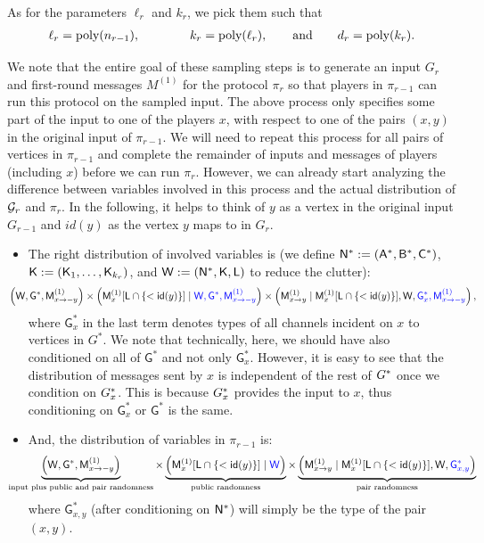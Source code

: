 \documentclass[11pt]{article}
\theoremstyle{definition}
\newcommand{\paren}[1]{\ensuremath{\left(#1\right)}\xspace}
\newcommand{\poly}{\mbox{\rm poly}}
\newcommand{\rv}[1]{\ensuremath{{\mathsf{#1}}}\xspace}
\newcommand{\rA}{\rv{A}}
\newcommand{\rB}{\rv{B}}
\newcommand{\rC}{\rv{C}}
\newcommand{\prot}{\ensuremath{\pi}}
\newcommand{\rG}{\ensuremath{\rv{G}}}
\newcommand{\rid}[1]{\ensuremath{\rv{id}(#1)}}
\begin{document}
As for the parameters $\ell_r$ and $k_r$, we pick them such that 
\begin{align}
	\ell_r = \poly(n_{r-1}), \qquad \qquad k_r = \poly(\ell_r), \qquad \text{and} \qquad d_r = \poly(k_r). \label{eq:overview-para2}
\end{align}
\vspace{-20pt}

We note that the entire goal of these sampling steps is to generate an input $G_r$ and first-round messages $M^{(1)}$ for the protocol $\prot_r$ so that players in $\prot_{r-1}$ can run this protocol on the sampled input. 
The above process only specifies some part of the input to one of the players $x$, with respect to one of the pairs $(x,y)$ in the original input of $\prot_{r-1}$. We will need to repeat this process for all pairs of 
vertices in $\prot_{r-1}$ and complete the remainder of inputs and messages of players (including $x$) before we can run $\prot_r$. However, we can already start analyzing the difference between variables involved in this process 
and the actual distribution of $\mathcal{G}_r$ and $\prot_r$. In the following, it helps to think of $y$ as a vertex in the original input $G_{r-1}$ and $id(y)$ as 
the vertex $y$ maps to in $G_r$. 
\vspace{-7pt}
\begin{itemize}
	\item The right distribution of involved variables is (we define $\rN^* := (\rA^*,\rB^*,\rC^*)$, $\rK := (\rK_1,\ldots,\rK_{k_r})$, and $\rW := (\rN^*,\rK,\rL)$ to reduce the clutter): 
	\[
	\hspace{-20pt}	\paren{\rW,\rG^*,\rM^{(1)}_{x \rightarrow -y}} \times \paren{\rM^{(1)}_{x}[\rL \cap \{<\rid{y}\}] \mid \eqcolor{\rW,\rG^*,\rM^{(1)}_{x \rightarrow -y}}} \times \paren{\rM^{(1)}_{x \rightarrow y} \mid \rM^{(1)}_{x}[\rL \cap \{<\rid{y}\}] , \rW,\eqcolor{\rG^*_x,\rM^{(1)}_{x \rightarrow -y}}},
	\]
	where  $\rG^*_x$ in the last term denotes types of all channels incident on $x$ to vertices in $G^*$. We note that technically, here, we should have also
	conditioned on all of $\rG^*$ and not only $\rG^*_x$. However, it is easy to see that the distribution of messages sent by $x$ is independent of the rest of $G^*$ once we condition on $G^*_x$. This is because $G^*_x$ provides
	the input to $x$, thus conditioning on $\rG^*_x$ or $\rG^*$ is the same. 
	\item And, the distribution of variables in $\prot_{r-1}$ is: 
	\[
	\hspace{-20pt}	\underbrace{\paren{\rW,\rG^*,\rM^{(1)}_{x \rightarrow -y}}}_{\textnormal{input plus public and pair randomness}} \times \underbrace{\paren{\rM^{(1)}_{x}[\rL \cap \{<\rid{y}\}] \mid \eqcolor{\rW}}}_{\textnormal{public randomness}} \times 
	\underbrace{\paren{\rM^{(1)}_{x \rightarrow y} \mid \rM^{(1)}_{x}[\rL \cap \{<\rid{y}\}] , \rW,\eqcolor{\rG_{x,y}^*}}}_{\textnormal{pair randomness}}
	\]
	where $\rG_{x,y}^*$ (after conditioning on $\rN^*$) will simply be the type of the pair $(x,y)$. 
\end{itemize}
\end{document}

